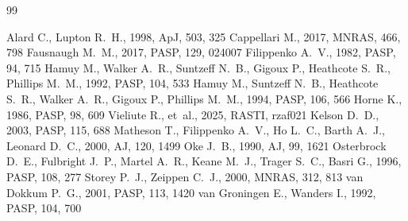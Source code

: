 \documentclass[10pt,a4paper,oneside]{report}
\begin{document}
\begin{thebibliography}{99}
 Alard C., Lupton R.~H., 1998, ApJ, 503, 325
 Cappellari M., 2017, MNRAS, 466, 798
 Fausnaugh M.~M., 2017, PASP, 129, 024007
 Filippenko A.~V., 1982, PASP, 94, 715
 Hamuy M., Walker A.~R., Suntzeff N.~B., Gigoux P.,
  Heathcote S.~R., Phillips M.~M., 1992, PASP, 104, 533
 Hamuy M., Suntzeff N.~B., Heathcote S.~R., Walker
  A.~R., Gigoux P., Phillips M.~M., 1994, PASP, 106, 566
 Horne K., 1986, PASP, 98, 609
 Vieliute R., et~al., 2025, RASTI, rzaf021
 Kelson D.~D., 2003, PASP, 115, 688
 Matheson T., Filippenko A.~V., Ho L.~C., Barth A.~J., Leonard D.~C.,
2000, AJ, 120, 1499
 Oke J.~B., 1990, AJ, 99, 1621
 Osterbrock D.~E., Fulbright J.~P.,
  Martel A.~R., Keane M.~J., Trager S.~C., Basri G., 1996, PASP, 108, 277
 Storey P.~J., Zeippen C.~J., 2000, MNRAS, 312, 813
 van Dokkum P.~G., 2001, PASP, 113, 1420
 van Groningen E., Wanders I., 1992, PASP, 104, 700
\end{thebibliography}

\appendix



\end{document}
